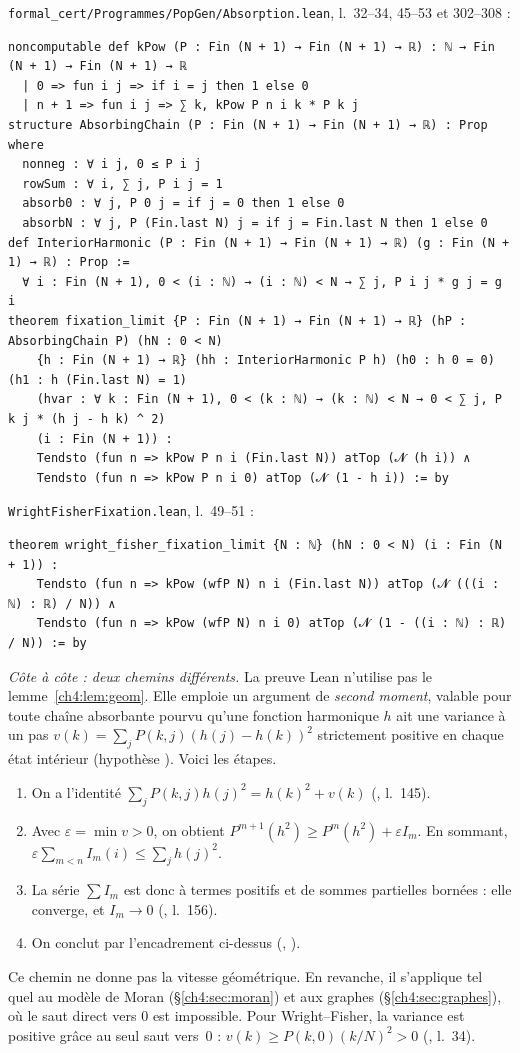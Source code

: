 \begin{leanbox}
\texttt{formal\_cert/Programmes/PopGen/Absorption.lean}, l.~32--34, 45--53 et 302--308 :
\begin{lstlisting}[language=Lean]
noncomputable def kPow (P : Fin (N + 1) → Fin (N + 1) → ℝ) : ℕ → Fin (N + 1) → Fin (N + 1) → ℝ
  | 0 => fun i j => if i = j then 1 else 0
  | n + 1 => fun i j => ∑ k, kPow P n i k * P k j
structure AbsorbingChain (P : Fin (N + 1) → Fin (N + 1) → ℝ) : Prop where
  nonneg : ∀ i j, 0 ≤ P i j
  rowSum : ∀ i, ∑ j, P i j = 1
  absorb0 : ∀ j, P 0 j = if j = 0 then 1 else 0
  absorbN : ∀ j, P (Fin.last N) j = if j = Fin.last N then 1 else 0
def InteriorHarmonic (P : Fin (N + 1) → Fin (N + 1) → ℝ) (g : Fin (N + 1) → ℝ) : Prop :=
  ∀ i : Fin (N + 1), 0 < (i : ℕ) → (i : ℕ) < N → ∑ j, P i j * g j = g i
theorem fixation_limit {P : Fin (N + 1) → Fin (N + 1) → ℝ} (hP : AbsorbingChain P) (hN : 0 < N)
    {h : Fin (N + 1) → ℝ} (hh : InteriorHarmonic P h) (h0 : h 0 = 0) (h1 : h (Fin.last N) = 1)
    (hvar : ∀ k : Fin (N + 1), 0 < (k : ℕ) → (k : ℕ) < N → 0 < ∑ j, P k j * (h j - h k) ^ 2)
    (i : Fin (N + 1)) :
    Tendsto (fun n => kPow P n i (Fin.last N)) atTop (𝓝 (h i)) ∧
    Tendsto (fun n => kPow P n i 0) atTop (𝓝 (1 - h i)) := by
\end{lstlisting}
\texttt{WrightFisherFixation.lean}, l.~49--51 :
\begin{lstlisting}[language=Lean]
theorem wright_fisher_fixation_limit {N : ℕ} (hN : 0 < N) (i : Fin (N + 1)) :
    Tendsto (fun n => kPow (wfP N) n i (Fin.last N)) atTop (𝓝 (((i : ℕ) : ℝ) / N)) ∧
    Tendsto (fun n => kPow (wfP N) n i 0) atTop (𝓝 (1 - ((i : ℕ) : ℝ) / N)) := by
\end{lstlisting}
\emph{Côte à côte : deux chemins différents.} La preuve Lean n'utilise pas le lemme~\ref{ch4:lem:geom}. Elle
emploie un argument de \emph{second moment}, valable pour toute chaîne absorbante pourvu qu'une fonction
harmonique $h$ ait une variance à un pas $v(k)=\sum_jP(k,j)(h(j)-h(k))^2$ strictement positive en chaque état
intérieur (hypothèse ). Voici les étapes.
\begin{enumerate}[itemsep=1pt]
\item On a l'identité $\sum_jP(k,j)h(j)^2=h(k)^2+v(k)$ (, l.~145).
\item Avec $\varepsilon=\min v>0$, on obtient $P^{m+1}(h^2)\ge P^m(h^2)+\varepsilon I_m$. En sommant,
$\varepsilon\sum_{m<n}I_m(i)\le\sum_jh(j)^2$.
\item La série $\sum I_m$ est donc à termes positifs et de sommes partielles bornées : elle converge, et
$I_m\to0$ (, l.~156).
\item On conclut par l'encadrement ci-dessus (, ).
\end{enumerate}
Ce chemin ne donne pas la vitesse géométrique. En revanche, il s'applique tel quel au modèle de Moran
(§\ref{ch4:sec:moran}) et aux graphes (§\ref{ch4:sec:graphes}), où le saut direct vers $0$ est impossible. Pour
Wright--Fisher, la variance est positive grâce au seul saut vers~$0$ : $v(k)\ge P(k,0)(k/N)^2>0$
(, l.~34).
\end{leanbox}

